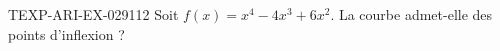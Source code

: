\begin{exercice}{TEXP-ARI-EX-029}{1}{12}
Soit $f(x) = x^4 - 4x^3 + 6x^2$. La courbe admet-elle des points d'inflexion ?

\end{exercice}

